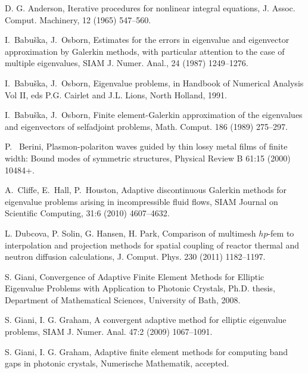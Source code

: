 \documentclass[smallextended]{svjour3}
\begin{document}
 
 
\begin{thebibliography}{10} 
{\sc D. G. Anderson,} 
 { Iterative procedures for nonlinear integral equations,} 
{J. Assoc. Comput.
Machinery,} 12 (1965) 547--560.

{\sc I.~Babu\v{s}ka, J.~Osborn,} 
 { Estimates for the errors in eigenvalue and eigenvector
  approximation by Galerkin methods, with particular attention to the
  case of multiple eigenvalues}, 
{ SIAM J. Numer. Anal.}, 24 (1987) 1249--1276.

{\sc I.~Babu\v{s}ka, J.~Osborn,} 
 { Eigenvalue problems},
 in Handbook of Numerical Analysis Vol II, eds P.G. Cairlet and J.L. Lions, North Holland, 1991.

{\sc I.~Babu\v{s}ka, J.~Osborn,} 
 { Finite element-Galerkin approximation of the
  eigenvalues and eigenvectors of selfadjoint problems}, 
{ Math. Comput.} 186 (1989) 275--297.

{\sc P.~ Berini,}
	{ Plasmon-polariton waves guided by thin lossy metal films of finite width: 
	Bound modes of symmetric structures},
	{ Physical Review B} 61:15 (2000) 10484+.

{\sc A.~Cliffe, E.~Hall, P.~Houston,}
	{ Adaptive discontinuous Galerkin methods for eigenvalue problems arising in 
	incompressible fluid flows},
	{ {SIAM} Journal on Scientific Computing}, 31:6 (2010)  4607--4632.

{\sc L. Dubcova, P. Solin, G. Hansen, H. Park,}
{ Comparison of multimesh $hp$-fem 
to interpolation and projection methods for spatial coupling of reactor 
thermal and neutron diffusion calculations}, 
{J. Comput. Phys.} 230 (2011)  1182--1197.

{\sc S. Giani,}
{ Convergence of Adaptive Finite Element Methods for Elliptic
Eigenvalue Problems with Application to
Photonic Crystals},
{Ph.D. thesis, Department of Mathematical Sciences, University of Bath, 2008}.

{\sc S. Giani, I. G. Graham,}
 { A convergent adaptive method for elliptic eigenvalue problems},
{ SIAM J. Numer. Anal.} 47:2 (2009)  1067--1091.

{\sc S. Giani, I. G. Graham,}
{ Adaptive finite element methods for computing band
gaps in photonic crystals},
{Numerische Mathematik}, accepted.


\end{thebibliography}
\end{document}
